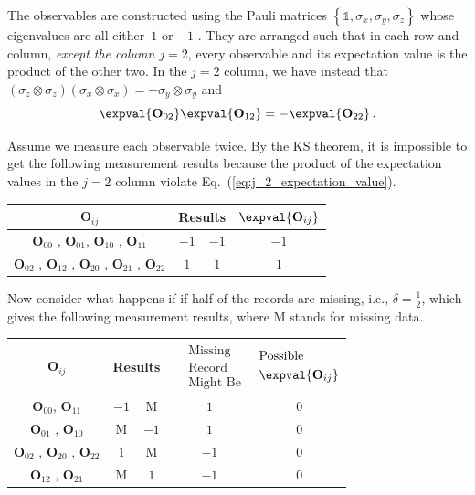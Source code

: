 \documentclass[english,reprint, aps, prl,superscriptaddress, showpacs,
showkeys, longbibliography, amsmath, amssymb, floatfix]{revtex4-1}
\theoremstyle{plain}
\theoremstyle{definition}
\newcommand{\missing}{\text{M}}
\begin{document}
\noindent The observables are constructed using the Pauli matrices
$\left\{ \mathbb{1},\sigma_{x},\sigma_{y},\sigma_{z}\right\} $ whose
eigenvalues are all either~$1$ or $-1$ \cite{Redhead1987-REDINA,544199,Griffiths2003,Jaeger2007,Mermin2007}.
They are arranged such that in each row and column, \emph{except the
column $j=2$}, every observable and its expectation value is the
product of the other two. In the $j=2$ column, we have instead that
$\left(\sigma_{z}\otimes\sigma_{z}\right)\left(\sigma_{x}\otimes\sigma_{x}\right)=-\sigma_{y}\otimes\sigma_{y}$
and 
\begin{equation}
\expval{\mathbf{O}_{02}}\expval{\mathbf{O}_{12}}=-\expval{\mathbf{O}_{22}}\,.\label{eq:j_2_expectation_value}
\end{equation}

Assume we measure each observable twice. By the KS theorem, it is
impossible to get the following measurement results because the product
of the expectation values in the $j=2$ column violate Eq.~(\ref{eq:j_2_expectation_value}).
\begin{center}
\begin{tabular}{cccc}
\toprule 
\addlinespace
$\mathbf{O}_{ij}$  & \multicolumn{2}{c}{Results} & $\expval{\mathbf{O}_{ij}}$\tabularnewline
\midrule
\midrule 
\addlinespace
$\mathbf{O}_{00}$ , $\mathbf{O}_{01}$, $\mathbf{O}_{10}$ , $\mathbf{O}_{11}$  & $-1$ & $-1$ & $-1$\tabularnewline
\midrule 
\addlinespace
$\mathbf{O}_{02}$ , $\mathbf{O}_{12}$ , $\mathbf{O}_{20}$ , $\mathbf{O}_{21}$
, $\mathbf{O}_{22}$  & $1$ & $1$ & $1$\tabularnewline
\bottomrule
\end{tabular}
\par\end{center}

Now consider what happens if if half of the records are missing, i.e.,
$\delta=\frac{1}{2}$, which gives the following measurement results,
where $\missing$ stands for missing data.
\begin{center}
\begin{tabular}{ccccc}
\toprule 
\addlinespace
$\mathbf{O}_{ij}$  & \multicolumn{2}{c}{Results} & $\begin{aligned} & \textrm{Missing}\\
 & \textrm{Record}\\
 & \textrm{Might Be}
\end{aligned}
$ & $\begin{aligned} & \textrm{Possible}\\
 & \expval{\mathbf{O}_{ij}}
\end{aligned}
$\tabularnewline
\midrule
\midrule 
\addlinespace
$\mathbf{O}_{00}$, $\mathbf{O}_{11}$ & $-1$ & $\missing$ & $1$ & $0$\tabularnewline
\midrule 
\addlinespace
$\mathbf{O}_{01}$ , $\mathbf{O}_{10}$  & $\missing$ & $-1$ & $1$ & $0$\tabularnewline
\midrule 
\addlinespace
$\mathbf{O}_{02}$ , $\mathbf{O}_{20}$ , $\mathbf{O}_{22}$  & $1$ & $\missing$ & $-1$ & $0$\tabularnewline
\midrule 
\addlinespace
$\mathbf{O}_{12}$ , $\mathbf{O}_{21}$  & $\missing$ & $1$ & $-1$ & $0$\tabularnewline
\bottomrule
\end{tabular}
\par\end{center}
\end{document}

